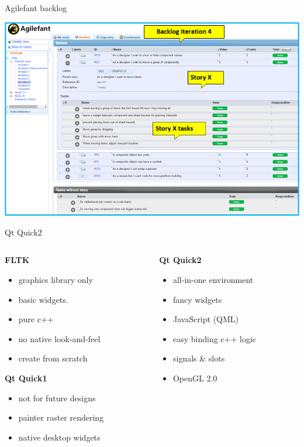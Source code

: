 \documentclass[11pt]{beamer}
\begin{document}
\begin{frame}{Agilefant backlog}
	\begin{center}
		\includegraphics[width=0.9\linewidth]{pictures/backlog}
	\end{center}
\end{frame}

\begin{frame}{Qt Quick2}
	\begin{columns}
		\begin{column}[t]{5cm}
			{\bf FLTK}
			\begin{itemize}
				\item <1-> graphics library only
				\item <1-> basic widgets.
				\item <1-> pure c++
				\item <1-> no native look-and-feel
				\item <1-> create from scratch
			\end{itemize}
			
			{\bf Qt Quick1}
			\begin{itemize}
				\item <2-> not for future designs
				\item <2-> painter raster rendering
				\item <2-> native desktop widgets
			\end{itemize}
		\end{column}
		\begin{column}[t]{5cm}
			\textbf{Qt Quick2}
			\begin{itemize}
				\item <3-> all-in-one environment
				\item <3-> fancy widgets
				\item <3-> JavaScript (QML)
				\item <3-> easy binding c++ logic
				\item <3-> signals \& slots
				\item <3-> OpenGL 2.0
			\end{itemize}
		\end{column}
	\end{columns}
\end{frame}
\end{document}
